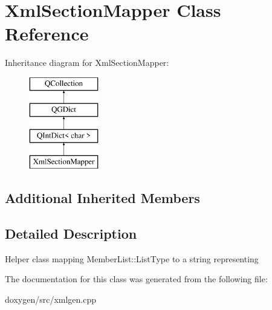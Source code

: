 \hypertarget{class_xml_section_mapper}{}\section{Xml\+Section\+Mapper Class Reference}
\label{class_xml_section_mapper}
Inheritance diagram for Xml\+Section\+Mapper\+:\begin{figure}[H]
\begin{center}
\leavevmode
\includegraphics[height=4.000000cm]{class_xml_section_mapper}
\end{center}
\end{figure}
\subsection*{Additional Inherited Members}


\subsection{Detailed Description}
Helper class mapping Member\+List\+::\+List\+Type to a string representing 

The documentation for this class was generated from the following file\+:\begin{DoxyCompactItemize}
\item 
doxygen/src/xmlgen.\+cpp\end{DoxyCompactItemize}
